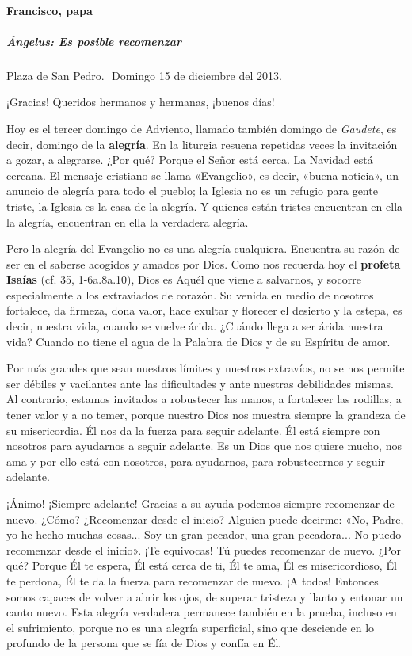 \documentclass[]{article}
\let\oldparagraph\paragraph
\renewcommand{\paragraph}[1]{\oldparagraph{#1}\mbox{}}
\let\oldsubparagraph\subparagraph
\renewcommand{\subparagraph}[1]{\oldsubparagraph{#1}\mbox{}}
\begin{document}
\paragraph{Francisco, papa}\label{francisco-papa-2}

\subparagraph{Ángelus: Es posible
recomenzar}\label{uxe1ngelus-es-posible-recomenzar}

Plaza de San Pedro.  Domingo 15 de diciembre del 2013.

¡Gracias! Queridos hermanos y hermanas, ¡buenos días!

Hoy es el tercer domingo de Adviento, llamado también domingo de
\emph{Gaudete}, es decir, domingo de la \textbf{alegría}. En la liturgia
resuena repetidas veces la invitación a gozar, a alegrarse. ¿Por qué?
Porque el Señor está cerca. La Navidad está cercana. El mensaje
cristiano se llama «Evangelio», es decir, «buena noticia», un anuncio de
alegría para todo el pueblo; la Iglesia no es un refugio para gente
triste, la Iglesia es la casa de la alegría. Y quienes están tristes
encuentran en ella la alegría, encuentran en ella la verdadera alegría.

Pero la alegría del Evangelio no es una alegría cualquiera. Encuentra su
razón de ser en el saberse acogidos y amados por Dios. Como nos recuerda
hoy el \textbf{profeta Isaías} (cf. 35, 1-6a.8a.10), Dios es Aquél que
viene a salvarnos, y socorre especialmente a los extraviados de corazón.
Su venida en medio de nosotros fortalece, da firmeza, dona valor, hace
exultar y florecer el desierto y la estepa, es decir, nuestra vida,
cuando se vuelve árida. ¿Cuándo llega a ser árida nuestra vida? Cuando
no tiene el agua de la Palabra de Dios y de su Espíritu de amor.

Por más grandes que sean nuestros límites y nuestros extravíos, no se
nos permite ser débiles y vacilantes ante las dificultades y ante
nuestras debilidades mismas. Al contrario, estamos invitados a
robustecer las manos, a fortalecer las rodillas, a tener valor y a no
temer, porque nuestro Dios nos muestra siempre la grandeza de su
misericordia. Él nos da la fuerza para seguir adelante. Él está siempre
con nosotros para ayudarnos a seguir adelante. Es un Dios que nos quiere
mucho, nos ama y por ello está con nosotros, para ayudarnos, para
robustecernos y seguir adelante.

¡Ánimo! ¡Siempre adelante! Gracias a su ayuda podemos siempre recomenzar
de nuevo. ¿Cómo? ¿Recomenzar desde el inicio? Alguien puede decirme:
«No, Padre, yo he hecho muchas cosas... Soy un gran pecador, una gran
pecadora... No puedo recomenzar desde el inicio». ¡Te equivocas! Tú
puedes recomenzar de nuevo. ¿Por qué? Porque Él te espera, Él está cerca
de ti, Él te ama, Él es misericordioso, Él te perdona, Él te da la
fuerza para recomenzar de nuevo. ¡A todos! Entonces somos capaces de
volver a abrir los ojos, de superar tristeza y llanto y entonar un canto
nuevo. Esta alegría verdadera permanece también en la prueba, incluso en
el sufrimiento, porque no es una alegría superficial, sino que desciende
en lo profundo de la persona que se fía de Dios y confía en Él.
\end{document}
